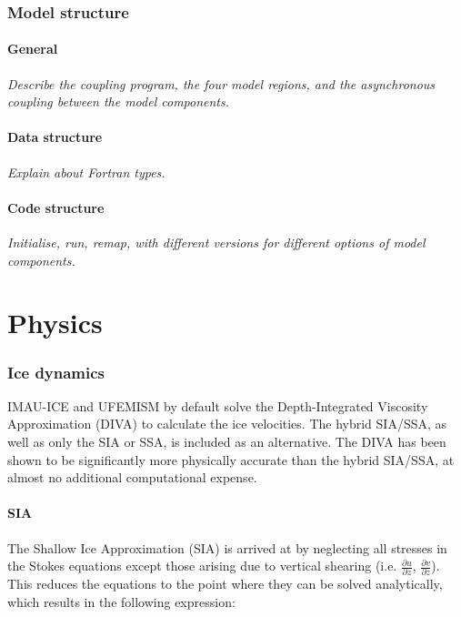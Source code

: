 \documentclass{article}
\begin{document}
\newpage
\section{Model structure}

\subsection{General}

\textit{Describe the coupling program, the four model regions, and the asynchronous coupling between the model components.}

\subsection{Data structure}

\textit{Explain about Fortran types.}

\subsection{Code structure}

\textit{Initialise, run, remap, with different versions for different options of model components.}

\newpage
\part{Physics}

\section{Ice dynamics}

IMAU-ICE and UFEMISM by default solve the Depth-Integrated Viscosity Approximation (DIVA) to calculate the ice velocities. The hybrid SIA/SSA, as well as only the SIA or SSA, is included as an alternative. The DIVA has been shown to be significantly more physically accurate than the hybrid SIA/SSA, at almost no additional computational expense.

\subsection{SIA}

The Shallow Ice Approximation (SIA) is arrived at by neglecting all stresses in the Stokes equations except those arising due to vertical shearing (i.e. $\frac{\partial u}{\partial z}$, $\frac{\partial v}{\partial z}$). This reduces the equations to the point where they can be solved analytically, which results in the following expression:
\end{document}
